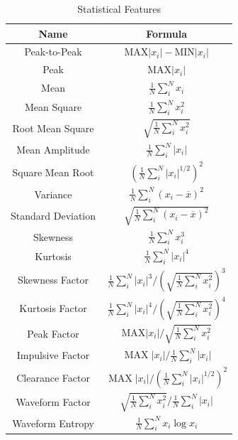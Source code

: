\documentclass{modified}
\begin{document}
\begin{table}[htbp]
	\centering
	\caption{Statistical Features}  
	\begin{tabular}{|c|c|}  
		\hline  
		Name & Formula\\  
		\hline  
		Peak-to-Peak  & $\mathrm{M} \mathrm{AX}|x_i|-\mathrm{MIN}|x_i|$ \\
		\hline  
		Peak  & $\mathrm{M} \mathrm{A} \mathrm{X}|x_i|$ \\ 
		\hline  
		Mean  & $\frac{1}{N} \sum\limits_{i}^{N} x_i$ \\ 
		\hline  
		Mean Square  & $\frac{1}{N} \sum\limits_{i}^{N} x_i^{2}$ \\ 
		\hline  
		Root Mean Square  & $\sqrt{\frac{1}{N} \sum\limits_{i}^{N} x_i^{2}}$ \\ 
		\hline  
		Mean Amplitude  & $\frac{1}{N} \sum\limits_{i}^{N}|x_i|$ \\
		\hline  
		Square Mean Root  & $\left(\frac{1}{N} \sum\limits_{i}^{N}|x_i|^{1 / 2}\right)^{2}$ \\ 
		\hline  
		Variance  & $\frac{1}{N} \sum\limits_{i}^{N}(x_i-\overline{x})^{2}$ \\ 
		\hline  
		Standard Deviation  & $\sqrt{\frac{1}{N} \sum\limits_{i}^{N}(x_i-\overline{x})^{2}}$ \\
		\hline   
		Skewness  & $\frac{1}{N} \sum\limits_{i}^{N} x_i^{3}$ \\ 
		\hline  
		Kurtosis  & $\frac{1}{N} \sum\limits_{i}^{N}|x_i|^{4}$ \\
		\hline  
		Skewness Factor  & $\frac{1}{N} \sum\limits_{i}^{N}|x_i|^{3} /\left(\sqrt{\frac{1}{N} \sum\limits_{i}^{N} x_i^{2}}\right)^{3}$ \\ 
		\hline  
		Kurtosis Factor  & $\frac{1}{N} \sum\limits_{i}^{N}|x_i|^{4} /\left(\sqrt{\frac{1}{N} \sum\limits_{i}^{N} x_i^{2}}\right)^{4}$ \\ 
		\hline  
		Peak Factor  & $\mathrm{MAX}|x_i| / \sqrt{\frac{1}{N} \sum\limits_{i}^{N} x_i^{2}}$ \\ 
		\hline  
		Impulsive Factor  & $\operatorname{MAX}|x_i| / \frac{1}{N} \sum\limits_{i}^{N}|x_i|$ \\ 
		\hline  
		Clearance Factor  & $\operatorname{MAX}|x_i| /\left(\frac{1}{N} \sum\limits_{i}^{N}|x_i|^{1 / 2}\right)^{2}$ \\ 
		\hline  
		Waveform Factor  & $\sqrt{\frac{1}{N} \sum\limits_{i}^{N} x_i^{2}} / \frac{1}{N} \sum\limits_{i}^{N}|x_i|$ \\ 
		\hline  
		Waveform Entropy \cite{ZHANG201914} & $\frac{1}{N}\sum\limits_{i}^{N}x_i\log x_i$ \\ 
		\hline  
	\end{tabular} 
	\label{tab:sf} 
\end{table} 
\end{document}
